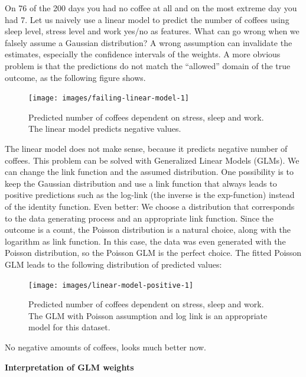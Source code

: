 \documentclass[
  12pt,
]{krantz}
\begin{document}
On 76 of the 200 days you had no coffee at all and on the most extreme day you had 7.
Let us naively use a linear model to predict the number of coffees using sleep level, stress level and work yes/no as features.
What can go wrong when we falsely assume a Gaussian distribution?
A wrong assumption can invalidate the estimates, especially the confidence intervals of the weights.
A more obvious problem is that the predictions do not match the ``allowed'' domain of the true outcome, as the following figure shows.

\begin{figure}

{\centering \texttt{[image: images/failing-linear-model-1]} 

}

\caption{Predicted number of coffees dependent on stress, sleep and work. The linear model predicts negative values.}\label{fig:failing-linear-model}
\end{figure}

The linear model does not make sense, because it predicts negative number of coffees.
This problem can be solved with Generalized Linear Models (GLMs).
We can change the link function and the assumed distribution.
One possibility is to keep the Gaussian distribution and use a link function that always leads to positive predictions such as the log-link (the inverse is the exp-function) instead of the identity function.
Even better:
We choose a distribution that corresponds to the data generating process and an appropriate link function.
Since the outcome is a count, the Poisson distribution is a natural choice, along with the logarithm as link function.
In this case, the data was even generated with the Poisson distribution, so the Poisson GLM is the perfect choice.
The fitted Poisson GLM leads to the following distribution of predicted values:

\begin{figure}

{\centering \texttt{[image: images/linear-model-positive-1]} 

}

\caption{Predicted number of coffees dependent on stress, sleep and work. The GLM with Poisson assumption and log link is an appropriate model for this dataset.}\label{fig:linear-model-positive}
\end{figure}

No negative amounts of coffees, looks much better now.

\textbf{Interpretation of GLM weights}
\end{document}
